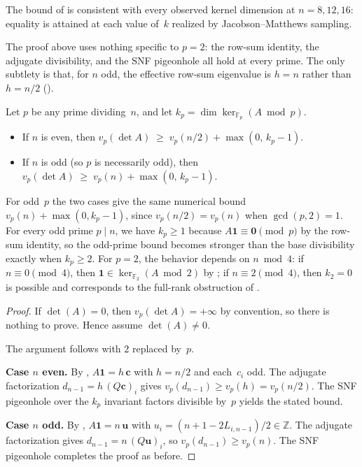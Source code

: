 \documentclass[11pt,a4paper]{article}
\newcommand{\ZZ}{\mathbb{Z}}
\newcommand{\FF}{\mathbb{F}}
\newcommand{\one}{\mathbf{1}}
\begin{document}
\begin{remark}
The bound of  is consistent with every observed
kernel dimension at $n=8,12,16$: equality is attained at each
value of~$k$ realized by Jacobson--Matthews sampling.
\end{remark}

The proof above uses nothing specific to $p=2$: the row-sum identity,
the adjugate divisibility, and the SNF pigeonhole all hold at every
prime.  The only subtlety is that, for $n$ odd, the effective row-sum
eigenvalue is $h=n$ rather than $h=n/2$ ().

\begin{corollary}\label{cor:sharp-vp}
Let $p$ be any prime dividing~$n$, and let
$k_p=\dim\ker_{\FF_p}(A\bmod p)$.
\begin{itemize}
  \item If $n$ is even, then
    $\displaystyle v_p(\det A)\;\ge\; v_p(n/2)+\max(0,\,k_p-1).$
  \item If $n$ is odd (so $p$ is necessarily odd), then
    $\displaystyle v_p(\det A)\;\ge\; v_p(n)+\max(0,\,k_p-1).$
\end{itemize}
For odd~$p$ the two cases give the same numerical bound $v_p(n)+\max(0,k_p-1)$,
since $v_p(n/2)=v_p(n)$ when $\gcd(p,2)=1$.
For every odd prime $p\mid n$, we have $k_p\ge 1$ because
$A\one\equiv\mathbf{0}\pmod{p}$ by the row-sum identity, so the
odd-prime bound becomes stronger than the base divisibility exactly when
$k_p\ge 2$.  For $p=2$, the behavior depends on $n\bmod 4$: if
$n\equiv0\pmod4$, then $\one\in\ker_{\FF_2}(A\bmod2)$ by
; if $n\equiv2\pmod4$, then $k_2=0$ is possible
and corresponds to the full-rank obstruction of
.
\end{corollary}

\begin{proof}
If $\det(A)=0$, then $v_p(\det A)=+\infty$ by convention, so there is
nothing to prove.  Hence assume $\det(A)\neq 0$.

The argument follows  with $2$ replaced by~$p$.

\smallskip\noindent\textbf{Case $n$ even.}
By , $A\one=h\,\mathbf{c}$ with $h=n/2$ and
each~$c_i$ odd.  The adjugate factorization
$d_{n-1}=h\,(Q\mathbf{c})_i$ gives $v_p(d_{n-1})\ge v_p(h)=v_p(n/2)$.
The SNF pigeonhole over the $k_p$ invariant factors divisible by~$p$
yields the stated bound.

\smallskip\noindent\textbf{Case $n$ odd.}
By , $A\one=n\,\mathbf{u}$ with
$u_i=(n{+}1{-}2L_{i,n-1})/2\in\ZZ$.  The adjugate factorization gives
$d_{n-1}=n\,(Q\mathbf{u})_i$, so $v_p(d_{n-1})\ge v_p(n)$.  The SNF
pigeonhole completes the proof as before.
\end{proof}
\end{document}
